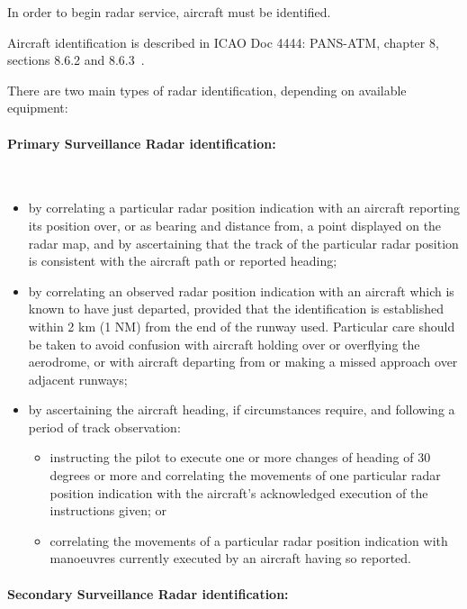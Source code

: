 In order to begin radar service, aircraft must be identified.

Aircraft identification is described in ICAO Doc 4444: PANS-ATM, chapter 8,
sections 8.6.2 and 8.6.3~\cite{4444}.

There are two main types of radar identification, depending on available
equipment:

\paragraph{Primary Surveillance Radar identification:}~\cite[sect.
8.6.2.4]{4444}

\begin{itemize}
\item by correlating a particular radar position indication with an aircraft
reporting its position over, or as bearing and distance from, a point displayed
on the radar map, and by ascertaining that the track of the particular radar
position is consistent with the aircraft path or reported heading;
\item by correlating an observed radar position indication with an aircraft
which is known to have just departed, provided that the identification is
established within 2 km (1 NM) from the end of the runway used. Particular care
should be taken to avoid confusion with aircraft holding over or overflying the
aerodrome, or with aircraft departing from or making a missed approach over
adjacent runways;
\item by ascertaining the aircraft heading, if circumstances require, and
following a period of track observation:
  \begin{itemize}
  \item instructing the pilot to execute one or more changes of heading of 30
degrees or more and correlating the movements of one particular radar position
indication with the aircraft's acknowledged execution of the instructions given;
or
  \item correlating the movements of a particular radar position indication with
manoeuvres currently executed by an aircraft having so reported.
  \end{itemize}
\end{itemize}

\paragraph{Secondary Surveillance Radar identification:}~\cite[sect.
8.6.2.3]{4444}

